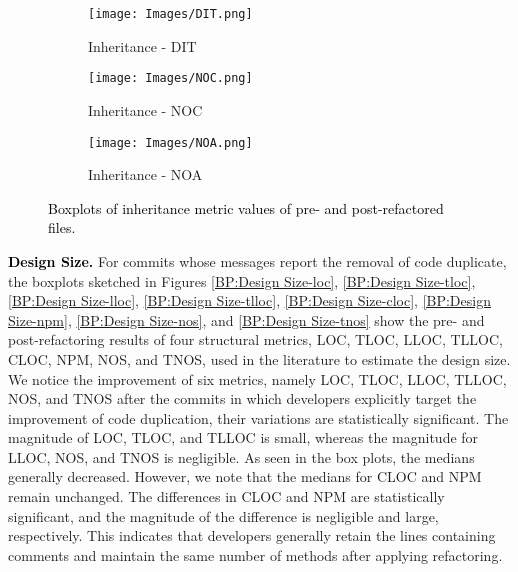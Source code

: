 \begin{figure*}
\centering
\begin{subfigure}{3.5cm}
\centering\texttt{[image: Images/DIT.png]}
\caption{Inheritance - DIT}
\label{BP:Inheritance-dit}
\end{subfigure}%
\begin{subfigure}{3.5cm}
\centering\texttt{[image: Images/NOC.png]}
\caption{Inheritance - NOC}
\label{BP:Inheritance-noc}
\end{subfigure}%
\begin{subfigure}{3.5cm}
\centering\texttt{[image: Images/NOA.png]}
\caption{Inheritance - NOA}
\label{BP:Inheritance-noa}
\end{subfigure}%
\caption{\textcolor{black}{Boxplots of inheritance metric values of pre- and post-refactored files.}}
\label{Chart:Boxplots_inheritance}
\end{figure*}
\noindent\textbf{\textcolor{black}{Design Size.}} For commits whose messages report the removal of code duplicate, the boxplots sketched in Figures \ref{BP:Design Size-loc}, \ref{BP:Design Size-tloc}, \ref{BP:Design Size-lloc}, \ref{BP:Design Size-tlloc}, \ref{BP:Design Size-cloc},  \ref{BP:Design Size-npm}, \ref{BP:Design Size-nos}, and \ref{BP:Design Size-tnos}  show the pre- and post-refactoring results of four structural metrics, \ie LOC, TLOC, LLOC, TLLOC, CLOC,  NPM, NOS, and TNOS, used in the literature to estimate the design size. We notice the improvement of six metrics, namely LOC, TLOC, LLOC, TLLOC, NOS, and TNOS after the commits in which developers explicitly target the improvement of code duplication, their variations are statistically significant.  
 The magnitude of LOC, TLOC, and TLLOC is small, whereas the magnitude for LLOC, NOS, and TNOS is negligible. As seen in the box plots, the medians generally decreased. However, we note that the medians for CLOC and NPM remain unchanged. The differences in CLOC and NPM are statistically significant, and the magnitude of the difference is negligible and large, respectively. This indicates that developers generally retain the lines containing comments and maintain the same number of methods after applying refactoring. %

